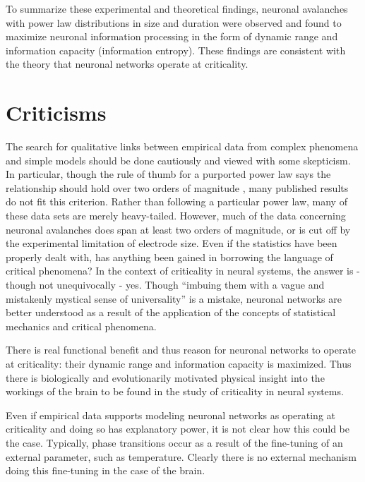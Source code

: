 \documentclass[12pt]{article}
\begin{document}
To summarize these experimental and theoretical findings, neuronal avalanches with power law distributions in size and duration were observed and found to maximize neuronal information processing in the form of dynamic range and information capacity (information entropy). These findings are consistent with the theory that neuronal networks operate at criticality. 



\section*{Criticisms} The search for qualitative links between empirical data from complex phenomena and simple models should be done cautiously and viewed with some skepticism. In particular, though the rule of thumb for a purported power law says the relationship should hold over two orders of magnitude \cite{Sethna2011a}, many published results do not fit this criterion. Rather than following a particular power law, many of these data sets are merely heavy-tailed. However, much of the data concerning neuronal avalanches does span at least two orders of magnitude, or is cut off by the experimental limitation of electrode size. Even if the statistics have been properly dealt with, has anything been gained in borrowing the language of critical phenomena? In the context of criticality in neural systems, the answer is - though not unequivocally - yes. Though ``imbuing them with a vague and mistakenly mystical sense of universality'' \cite{Stumpf2012a} is a mistake, neuronal networks are better understood as a result of the application of the concepts of statistical mechanics and critical phenomena. 

There is real functional benefit and thus reason for neuronal networks to operate at criticality: their dynamic range and information capacity is maximized. Thus there is biologically and evolutionarily motivated physical insight into the workings of the brain to be found in the study of criticality in neural systems.

Even if empirical data supports modeling neuronal networks as operating at criticality and doing so has explanatory power, it is not clear how this could be the case. Typically, phase transitions occur as a result of the fine-tuning of an external parameter, such as temperature. Clearly there is no external mechanism doing this fine-tuning in the case of the brain. 
\end{document}
